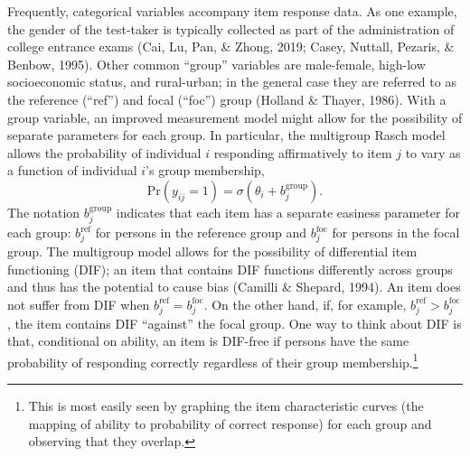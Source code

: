 \documentclass[
  english,
  man,floatsintext]{apa6}
\begin{document}
Frequently, categorical variables accompany item response data. As one example, the gender of the test-taker is typically collected as part of the administration of college entrance exams (Cai, Lu, Pan, \& Zhong, 2019; Casey, Nuttall, Pezaris, \& Benbow, 1995). Other common ``group'' variables are male-female, high-low socioeconomic status, and rural-urban; in the general case they are referred to as the reference (``ref'') and focal (``foc'') group (Holland \& Thayer, 1986). With a group variable, an improved measurement model might allow for the possibility of separate parameters for each group. In particular, the multigroup Rasch model allows the probability of individual \(i\) responding affirmatively to item \(j\) to vary as a function of individual \(i\)'s group membership,
\begin{equation}
\label{eq:rasch}
\text{Pr}(y_{ij} = 1) = \sigma(\theta_{i} + b_j^\text{group}).
\end{equation}
The notation \(b_j^{\text{group}}\) indicates that each item has a separate easiness parameter for each group: \(b_j^{\text{ref}}\) for persons in the reference group and \(b_j^{\text{foc}}\) for persons in the focal group. The multigroup model allows for the possibility of differential item functioning (DIF); an item that contains DIF functions differently across groups and thus has the potential to cause bias (Camilli \& Shepard, 1994). An item does not suffer from DIF when \(b_j^{\text{ref}} = b_j^{\text{foc}}\). On the other hand, if, for example, \(b_j^{\text{ref}} > b_j^{\text{foc}}\), the item contains DIF ``against'' the focal group. One way to think about DIF is that, conditional on ability, an item is DIF-free if persons have the same probability of responding correctly regardless of their group membership.\footnote{This is most easily seen by graphing the item characteristic curves (the mapping of ability to probability of correct response) for each group and observing that they overlap.}
\end{document}
